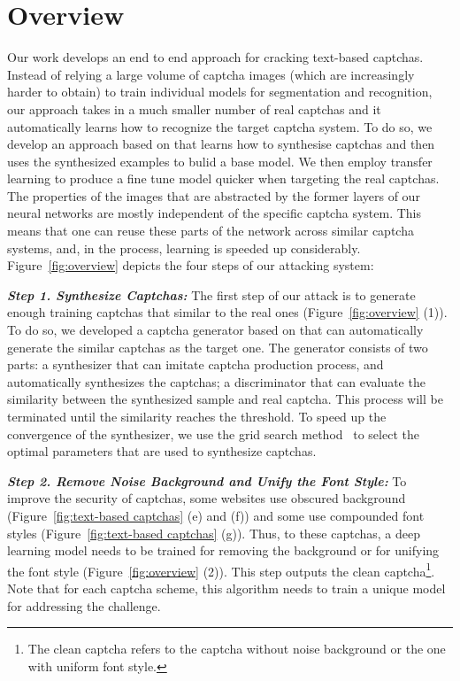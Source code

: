 \section{Overview}
Our work develops an end to end approach for cracking text-based captchas. Instead of relying a large volume of captcha images (which are
increasingly harder to obtain) to train individual models for segmentation and recognition, our approach takes in a much smaller number of
real captchas and it automatically learns how to recognize the target captcha system.
To do so, we develop an approach based on \GANs that learns how to synthesise captchas and then uses the synthesized examples to bulid a base model. We then employ transfer learning to produce a fine tune model quicker when targeting the real captchas. The properties of the images that are abstracted by the former layers of our neural networks are mostly independent of the specific captcha system. This means that one can reuse these parts of the network across similar captcha systems, and, in the process, learning is speeded up considerably. Figure~\ref{fig:overview} depicts the four steps of our attacking system:

\noindent \textbf{\emph{Step 1. Synthesize Captchas:}}
The first step of our attack is to generate enough training captchas that similar to the real ones (Figure~\ref{fig:overview} (1)). To do so, we developed a captcha generator based on \GANs that can automatically generate the similar captchas as the target one. The generator consists of two parts: a synthesizer that can imitate captcha production process, and automatically synthesizes the captchas; a discriminator that can evaluate the similarity between the synthesized sample and real captcha. This process will be terminated until the similarity reaches the threshold. To speed up the convergence of the synthesizer, we use the grid search method~\cite{Audet2006Mesh} to select the optimal parameters that are used to synthesize captchas.

\noindent \textbf{\emph{Step 2. Remove Noise Background and Unify the Font Style:}}
To improve the security of captchas, some websites use obscured background (Figure~\ref{fig:text-based captchas} (e) and (f)) and some use compounded font styles (Figure~\ref{fig:text-based captchas} (g)). Thus, to these captchas, a deep learning model needs to be trained for removing the background or for unifying the font style (Figure~\ref{fig:overview} (2)). This step outputs the clean captcha\footnote{The clean captcha refers to the captcha without noise background or the one with uniform font style.}.
Note that for each captcha scheme, this algorithm needs to train a unique model for addressing the challenge.


